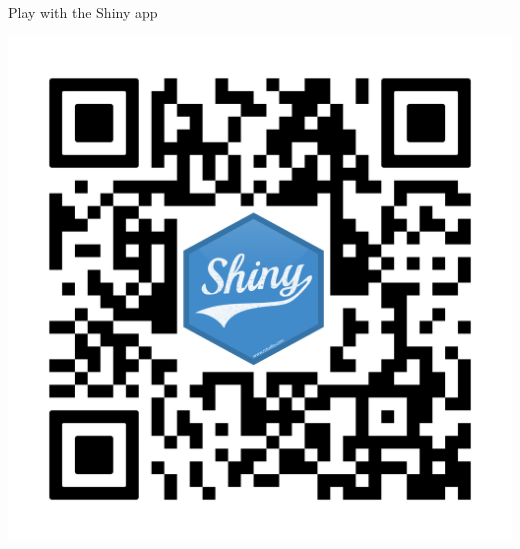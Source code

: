 \documentclass{beamer}\usepackage[]{graphicx}\usepackage[]{xcolor}
\begin{document}
\begin{frame}[fragile]
\begin{columns}
  \begin{column}{.28\textwidth}
    \begin{block}{Play with the Shiny app}
      \begin{center}
        \includegraphics[width = 15cm]{images/Shiny_app.png}
        \end{center}
  
    \end{block}
  \end{column}


\end{columns}
\end{frame}
\end{document}
